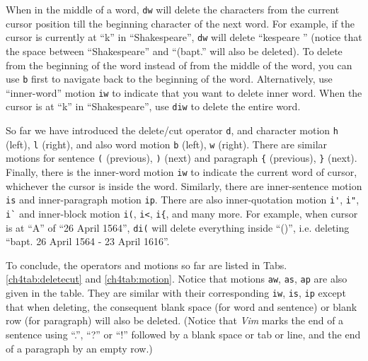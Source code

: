 When in the middle of a word, \verb|dw| will delete the characters from the current cursor position till the beginning character of the next word. For example, if the cursor is currently at ``k'' in ``Shakespeare'', \verb|dw| will delete ``kespeare '' (notice that the space between ``Shakespeare'' and ``(bapt.'' will also be deleted). To delete from the beginning of the word instead of from the middle of the word, you can use \verb|b| first to navigate back to the beginning of the word. Alternatively, use ``inner-word'' motion \verb|iw| to indicate that you want to delete inner word. When the cursor is at ``k'' in ``Shakespeare'', use \verb|diw| to delete the entire word.

So far we have introduced the delete/cut operator \verb|d|, and character motion \verb|h| (left), \verb|l| (right), and also word motion \verb|b| (left), \verb|w| (right). There are similar motions for sentence \verb|(| (previous), \verb|)| (next) and paragraph \verb|{| (previous), \verb|}| (next). Finally, there is the inner-word motion \verb|iw| to indicate the current word of cursor, whichever the cursor is inside the word. Similarly, there are inner-sentence motion \verb|is| and inner-paragraph motion \verb|ip|. There are also inner-quotation motion \verb|i'|, \verb|i"|, \verb|i`| and inner-block motion \verb|i(|, \verb|i<|, \verb|i{|, and many more. For example, when cursor is at ``A'' of ``26 April 1564'', \verb|di(| will delete everything inside ``()'', i.e. deleting ``bapt. 26 April 1564 - 23 April 1616''.

To conclude, the operators and motions so far are listed in Tabs. \ref{ch4tab:deletecut} and \ref{ch4tab:motion}. Notice that motions \verb|aw|, \verb|as|, \verb|ap| are also given in the table. They are similar with their corresponding \verb|iw|, \verb|is|, \verb|ip| except that when deleting, the consequent blank space (for word and sentence) or blank row (for paragraph) will also be deleted. (Notice that \textit{Vim} marks the end of a sentence using ``.'', ``?'' or ``!'' followed by a blank space or tab or line, and the end of a paragraph by an empty row.)

